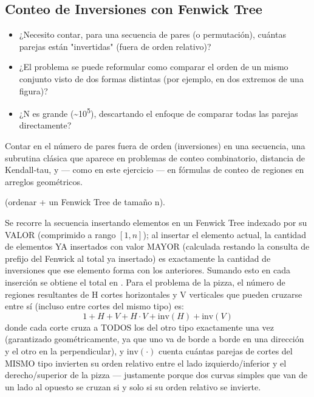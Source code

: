 \subsection{Conteo de Inversiones con Fenwick Tree}


\begin{itemize}
\item ¿Necesito contar, para una secuencia de pares (o permutación), cuántas parejas están "invertidas" (fuera de orden relativo)?
\item ¿El problema se puede reformular como comparar el orden de un mismo conjunto visto de dos formas distintas (por ejemplo, en dos extremos de una figura)?
\item ¿N es grande (\textasciitilde{}10\textsuperscript{5}), descartando el enfoque  de comparar todas las parejas directamente?
\end{itemize}

 Contar en  el número de pares fuera de orden (inversiones) en una secuencia, una subrutina clásica que aparece en problemas de conteo combinatorio, distancia de Kendall-tau, y — como en este ejercicio — en fórmulas de conteo de regiones en arreglos geométricos.

  (ordenar + un Fenwick Tree de tamaño n).

 Se recorre la secuencia insertando elementos en un Fenwick Tree indexado por su VALOR (comprimido a rango $[1,n]$); al insertar el elemento actual, la cantidad de elementos YA insertados con valor MAYOR (calculada restando la consulta de prefijo del Fenwick al total ya insertado) es exactamente la cantidad de inversiones que ese elemento forma con los anteriores. Sumando esto en cada inserción se obtiene el total en . Para el problema de la pizza, el número de regiones resultantes de H cortes horizontales y V verticales que pueden cruzarse entre sí (incluso entre cortes del mismo tipo) es:
$$1 + H + V + H \cdot V + \text{inv}(H) + \text{inv}(V)$$
donde cada corte cruza a TODOS los del otro tipo exactamente una vez (garantizado geométricamente, ya que uno va de borde a borde en una dirección y el otro en la perpendicular), y $\text{inv}(\cdot)$ cuenta cuántas parejas de cortes del MISMO tipo invierten su orden relativo entre el lado izquierdo/inferior y el derecho/superior de la pizza — justamente porque dos curvas simples que van de un lado al opuesto se cruzan si y solo si su orden relativo se invierte.

